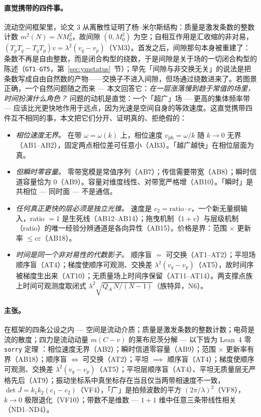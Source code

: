 \documentclass[aps,prd,preprint,superscriptaddress,amsmath,amssymb]{revtex4-2}
\begin{document}
\paragraph{直觉携带的四件事。}
流动空间框架里，论文 3 \cite{ProjectionPhysics,liu2026yangmills} 从离散性证明了杨--米尔斯结构：质量是激发条数的整数计数 $m^2(N)=N M_0^2$，故间隙 $(0,M_0^2)$ 为空；自相互作用是汇收缩的非对易，$(T_pT_q-T_qT_p)v=\lambda^2(v_q-v_p)$（YM3）。首发之后，间隙那句本身被重建了：条数不再是自由整数，而是闭合构型的绕数，于是间隙是关于场的一切闭合构型的陈述（\texttt{GT1}--\texttt{GT5}，第~\ref{sec:ymstatus}~节）；早先「间隙与非交换无关」的说法是把条数写成自由自然数的产物——交换子不进入间隙，但场通过绕数进来了。若图景正确，一个自然问题随之而来 --- 本文回答它：\emph{在一层涨落慢到趋于常值的场里，时间扮演什么角色？} 问题的动机是直觉：一个「超广」场 --- 更高的集体频率带 --- 应该比光更快地作用于远点，因为光速是空间自身的等效速度。这直觉携带四件互不相同的事，本文把它们分开、证明真的、拒绝假的：

\begin{itemize}
\item \emph{相位速度无界。} 在带 $\omega=\omega(k)$ 上，相位速度 $v_{\mathrm{ph}}=\omega/k$ 随 $k\to0$ 无界（AB1--AB2），固定两点相位差可任意小（AB3）。「越广越快」在相位层面为真。
\item \emph{但瞬时零容量。} 零带宽模是常值序列（AB7）；传信需要带宽（AB8）；瞬时信道容量恰为 0（AB9）。容量对维度线性、对带宽严格增（AB10）。「瞬时」是共相位 --- 同时面 --- 不是通信。
\item \emph{任何真正更快的层必须是独立光锥。} 速度是 $c_2=\mathrm{ratio}\cdot c$，一个新无量纲输入，ratio $=1$ 是生死线（AB12--AB14）；拖曳机制（$1+v$）与层级机制（ratio）的唯一经验分辨通道是各向异性（AB15）。价格是界：范围 $\times$ 更新率 $\le c\varepsilon$（AB18）。
\item \emph{时间是同一个非对易性的代数影子。} 顺序盲 $=$ 可交换（AT1--AT2）；平坦场顺序盲（AT4）；梯度使顺序可观测、交换差 $\lambda^2(v_q-v_p)$（AT5），故时间序被梯度生出来（AT10）；无质量场上时间序保留（AT11--AT14）。两支撑点族上时间可观测度取闭式 $\lambda^2\sqrt{Q_A\,N/(N-1)}$（族特异，N6）。
\end{itemize}

\paragraph{主张。}
在框架的四条公设之内 --- 空间是流动介质；质量是激发条数的整数计数；电荷是流的散度；四力是流动动量 $m(C-v)$ 的莱布尼茨分解 --- 以下皆为 Lean~4 零 \texttt{sorry} 定理 \cite{de2015lean,ProjectionPhysics}：相位速度无界（AB2）；瞬时信道零容量（AB9）；范围 $\times$ 更新率有界（AB18）；顺序盲 $\iff$ 可交换（AT2）；平坦 $\implies$ 顺序盲（AT4）；梯度使顺序可观测、交换差 $\lambda^2(v_q-v_p)$（AT5）；平坦层顺序盲（AT4）、平坦无质量层无严格先后（AT9）；振动坐标系中真坐标存在当且仅当两带相速度不一致，$\det J=k_1k_2(c_1-c_2)$（VF4），「广」是拍频波数的平方 $(2\pi/\lambda)^2$（VF8），$k\to0$ 极限退化（VF10）；带数不是维数 --- $1+1$ 维中任意三条带线性相关（ND1--ND4）。
\end{document}
